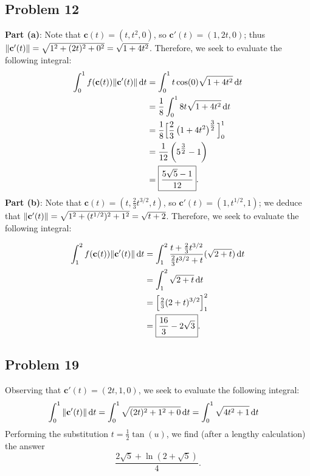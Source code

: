\documentclass[11pt]{article}
\renewcommand{\vec}[1]{\mathbf{#1}}
\begin{document}
\subsection*{Problem 12}

\textbf{Part (a)}: Note that $\vec{c}(t) = (t, t^{2}, 0)$, so $\vec{c}'(t) = (1, 2t, 0)$; thus $\norm{\vec{c}'(t)} = \sqrt{1^{2} + (2t)^{2} + 0^{2}} = \sqrt{1 + 4t^{2}}$. Therefore, we seek to evaluate the following integral:
\begin{align*}
	\int_{0}^{1} f(\vec{c}(t)) \norm{\vec{c}'(t)} \dd{t} &= \int_{0}^{1} t \cos(0) \sqrt{1 + 4t^{2}} \dd{t} \\
	&= \frac{1}{8} \int_{0}^{1} 8t \sqrt{1 + 4t^{2}} \dd{t} \\
	&= \frac{1}{8} \Big[ \frac{2}{3} \left( 1 + 4t^{2} \right)^{\tfrac{3}{2}} \Big]_{0}^{1} \\
	&= \frac{1}{12} \left( 5^{\tfrac{3}{2}} - 1 \right) \\
	&= \boxed{\frac{5 \sqrt{5} - 1}{12}}.
\end{align*}
\textbf{Part (b)}: Note that $\vec{c}(t) = \left( t, \tfrac{2}{3} t^{3/2}, t \right)$, so $\vec{c}'(t) = (1, t^{1/2}, 1)$; we deduce that $\norm{\vec{c}'(t)} = \sqrt{1^{2} + (t^{1/2})^{2} + 1^{2}} = \sqrt{t + 2}$. Therefore, we seek to evaluate the following integral:

\begin{align*}
	\int_{1}^{2} f(\vec{c}(t)) \norm{\vec{c}'(t)} \dd{t} &= \int_{1}^{2} \frac{t + \tfrac{2}{3}t^{3/2}}{\tfrac{2}{3}t^{3/2} + t} (\sqrt{2 + t}) \dd{t} \\
	&= \int_{1}^{2} \sqrt{2 + t} \dd{t} \\
	&= \Big[ \tfrac{2}{3} (2 + t)^{3/2} \Big]_{1}^{2} \\
	&= \boxed{\frac{16}{3} - 2 \sqrt{3}}.
\end{align*}


\subsection*{Problem 19}

Observing that $\vec{c}'(t) = (2t, 1, 0)$, we seek to evaluate the following integral:
\begin{align*}
	\int_{0}^{1} \norm{\vec{c}'(t)} \dd{t} = \int_{0}^{1} \sqrt{(2t)^{2} + 1^{2} + 0} \dd{t} 
	&= \int_{0}^{1} \sqrt{4t^{2} + 1} \dd{t} 
\end{align*}
Performing the substitution $t = \tfrac{1}{2} \tan(u)$, we find (after a lengthy calculation) the answer
\[
	\boxed{\frac{2\sqrt{5} + \ln(2 + \sqrt{5})}{4}}.
\]
\end{document}

